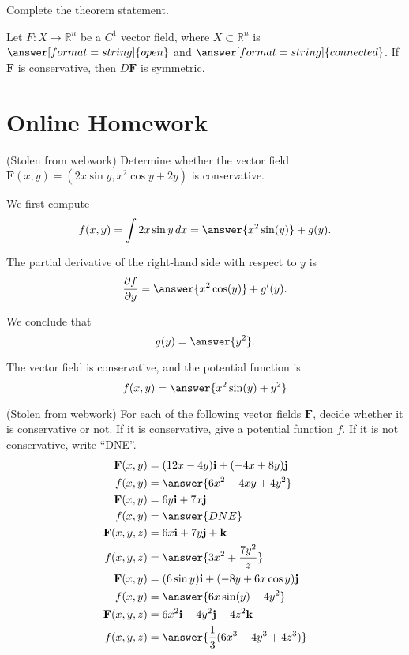 \documentclass{ximera}
\begin{document}
\begin{problem}
Complete the theorem statement.

Let $F:X\rightarrow\mathbb{R}^n$ be a $C^1$ vector field, where $X\subset\mathbb{R}^n$ is $\answer[format=string]{open}$ and $\answer[format=string]{connected}$. If $\mathbf{F}$ is conservative, then $D\mathbf{F}$ is symmetric.
\end{problem}

\section{Online Homework}


\begin{problem}
(Stolen from webwork) Determine whether the vector field $\mathbf{F}(x,y) = (2x\sin y,x^2\cos y + 2y)$ is conservative.

We first compute 
\[
f(x,y)=\int 2x\sin y\, dx = \answer{x^2\sin(y)}+g(y).
\]
\begin{problem}
The partial derivative of the right-hand side with respect to $y$ is
\[
\frac{\partial f}{\partial y} = \answer{x^2\cos(y)}+g'(y).
\]
\begin{problem}
We conclude that
\[
g(y) = \answer{y^2}.
\]
\begin{problem}
The vector field is conservative, and the potential function is
\[
f(x,y) = \answer{x^2\sin(y)+y^2}
\]
\end{problem}
\end{problem}
\end{problem}
\end{problem}

\begin{problem}
(Stolen from webwork) For each of the following vector fields $\mathbf{F}$, decide whether it is conservative or not. If it is conservative, give a potential function $f$. If it is not conservative, write ``DNE''.
\begin{align*}
\mathbf{F}(x,y) &= (12x-4y)\mathbf{i} + (-4x+8y)\mathbf{j}\\
f(x,y) &=  \answer{6x^2-4xy+4y^2}\\
\mathbf{F}(x,y) &= 6y\mathbf{i} + 7x\mathbf{j}\\
f(x,y) &= \answer{DNE}\\
\mathbf{F}(x,y,z) &= 6x\mathbf{i} + 7y\mathbf{j} + \mathbf{k}\\
f(x,y,z) &= \answer{3x^2+\frac{7y^2}{z}}\\
\mathbf{F}(x,y) &=(6\sin y)\mathbf{i} + (-8y+6x\cos y)\mathbf{j}\\
f(x,y) &= \answer{6x\sin(y)-4y^2}\\
\mathbf{F}(x,y,z) &= 6x^2\mathbf{i}-4y^2\mathbf{j}+4z^2\mathbf{k}\\
f(x,y,z) &= \answer{\frac{1}{3}(6x^3-4y^3+4z^3)}
\end{align*}
\end{problem}
\end{document}
